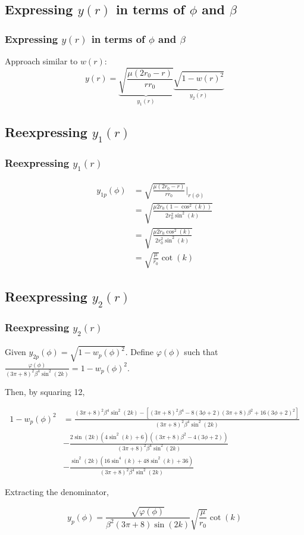 \documentclass{beamer}
\newcommand{\sectit}[1]{
    \section{\texorpdfstring{#1}{}}
    \frametitle{#1}
}
\begin{document}
\begin{frame}
    \sectit{Expressing $y(r)$ in terms of $\phi$ and $\beta$}

    Approach similar to $w(r)$:
    $$
    y(r)=\underbrace{\sqrt{\frac{\mu(2r_0-r)}{rr_0}}}_{y_1(r)}\underbrace{\sqrt{1-w(r)^2}}_{y_2(r)}
    $$
\end{frame}

\begin{frame}
    \sectit{Reexpressing $y_1(r)$}

    \begin{align}
        y_{1p}(\phi)&=\sqrt{\frac{\mu(2r_0-r)}{rr_0}}\bigg\rvert_{r(\phi)}\\
        &=\sqrt{\frac{\mu 2r_0(1-\cos^2(k))}{2r_0^2\sin^2(k)}}\\
        &=\sqrt{\frac{\mu 2r_0 \cos^2(k)}{2r_0^2 \sin^2(k)}}\\
        &=\sqrt{\frac{\mu}{r_0}}\cot(k)
    \end{align}
\end{frame}

\begin{frame}
    \sectit{Reexpressing $y_2(r)$}

    Given $y_{2p}(\phi)=\sqrt{1-w_p(\phi)^2}$.\newline
    Define $\varphi(\phi)$ such that $\frac{\varphi(\phi)}{(3\pi+8)^2\beta^4\sin^2(2k)}=1-w_p(\phi)^2$.

    Then, by squaring 12,

    {\tiny
        \begin{align}
            1-w_p(\phi)^2&=\frac{(3\pi+8)^2\beta^4\sin^2(2k)-\left[(3\pi+8)^2\beta^4-8(3\phi+2)(3\pi+8)\beta^2+16(3\phi+2)^2\right]}{(3\pi+8)^2\beta^4\sin^2(2k)}\\
            &-\frac{2\sin(2k)(4\sin^2(k)+6)((3\pi+8)\beta^2-4(3\phi+2))}{(3\pi+8)^2\beta^4\sin^2(2k)}\\
            &-\frac{\sin^2(2k)(16\sin^4(k)+48\sin^2(k)+36)}{(3\pi+8)^2\beta^4\sin^2(2k)}
        \end{align}
    }

    Extracting the denominator,

    \begin{equation}
    y_p(\phi)=\frac{\sqrt{\varphi(\phi)}}{\beta^2(3\pi+8)\sin(2k)}\sqrt{\frac{\mu}{r_0}}\cot(k)
    \end{equation}

\end{frame}
\end{document}
